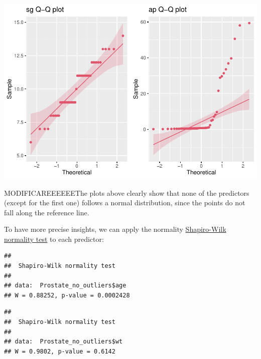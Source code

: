 \documentclass[
]{article}
\newenvironment{Shaded}{\begin{snugshade}}{\end{snugshade}}
\newcommand{\FunctionTok}[1]{\textcolor[rgb]{0.00,0.00,0.00}{#1}}
\newcommand{\NormalTok}[1]{#1}
\newcommand{\SpecialCharTok}[1]{\textcolor[rgb]{0.00,0.00,0.00}{#1}}
\begin{document}
\includegraphics{clustering_files/figure-latex/unnamed-chunk-27-4.pdf}

MODIFICAREEEEEEThe plots above clearly show that none of the predictors
(except for the first one) follows a normal distribution, since the
points do not fall along the reference line.

To have more precise insights, we can apply the normality
\href{https://en.wikipedia.org/wiki/Shapiro\%E2\%80\%93Wilk_test}{Shapiro-Wilk
normality test} to each predictor:

\begin{Shaded}
\end{Shaded}

\begin{verbatim}
## 
##  Shapiro-Wilk normality test
## 
## data:  Prostate_no_outliers$age
## W = 0.88252, p-value = 0.0002428
\end{verbatim}

\begin{Shaded}
\end{Shaded}

\begin{verbatim}
## 
##  Shapiro-Wilk normality test
## 
## data:  Prostate_no_outliers$wt
## W = 0.9802, p-value = 0.6142
\end{verbatim}
\end{document}
